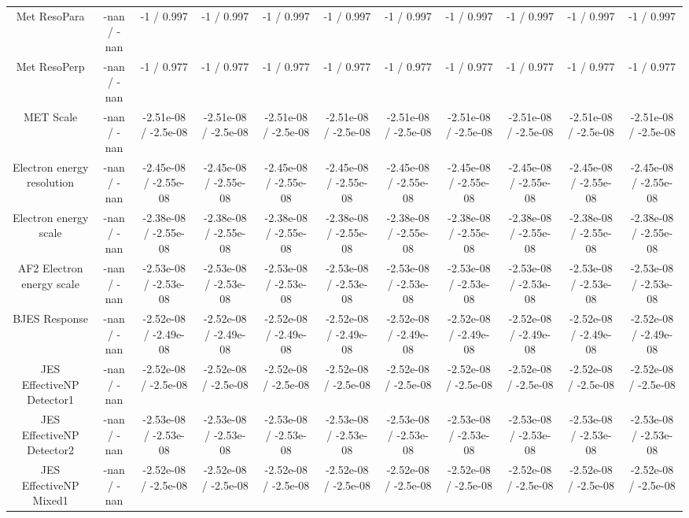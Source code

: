 \begin{table}[htbp]
\begin{center}
\begin{tabular}{|c|c|c|c|c|c|c|c|c|c|c|}
  Met ResoPara & -nan / -nan & -1 / 0.997 & -1 / 0.997 & -1 / 0.997 & -1 / 0.997 & -1 / 0.997 & -1 / 0.997 & -1 / 0.997 & -1 / 0.997 & -1 / 0.997 \\ 
  Met ResoPerp & -nan / -nan & -1 / 0.977 & -1 / 0.977 & -1 / 0.977 & -1 / 0.977 & -1 / 0.977 & -1 / 0.977 & -1 / 0.977 & -1 / 0.977 & -1 / 0.977 \\ 
  MET Scale & -nan / -nan & -2.51e-08 / -2.5e-08 & -2.51e-08 / -2.5e-08 & -2.51e-08 / -2.5e-08 & -2.51e-08 / -2.5e-08 & -2.51e-08 / -2.5e-08 & -2.51e-08 / -2.5e-08 & -2.51e-08 / -2.5e-08 & -2.51e-08 / -2.5e-08 & -2.51e-08 / -2.5e-08 \\ 
  Electron energy resolution & -nan / -nan & -2.45e-08 / -2.55e-08 & -2.45e-08 / -2.55e-08 & -2.45e-08 / -2.55e-08 & -2.45e-08 / -2.55e-08 & -2.45e-08 / -2.55e-08 & -2.45e-08 / -2.55e-08 & -2.45e-08 / -2.55e-08 & -2.45e-08 / -2.55e-08 & -2.45e-08 / -2.55e-08 \\ 
  Electron energy scale & -nan / -nan & -2.38e-08 / -2.55e-08 & -2.38e-08 / -2.55e-08 & -2.38e-08 / -2.55e-08 & -2.38e-08 / -2.55e-08 & -2.38e-08 / -2.55e-08 & -2.38e-08 / -2.55e-08 & -2.38e-08 / -2.55e-08 & -2.38e-08 / -2.55e-08 & -2.38e-08 / -2.55e-08 \\ 
  AF2 Electron energy scale & -nan / -nan & -2.53e-08 / -2.53e-08 & -2.53e-08 / -2.53e-08 & -2.53e-08 / -2.53e-08 & -2.53e-08 / -2.53e-08 & -2.53e-08 / -2.53e-08 & -2.53e-08 / -2.53e-08 & -2.53e-08 / -2.53e-08 & -2.53e-08 / -2.53e-08 & -2.53e-08 / -2.53e-08 \\ 
  BJES Response & -nan / -nan & -2.52e-08 / -2.49e-08 & -2.52e-08 / -2.49e-08 & -2.52e-08 / -2.49e-08 & -2.52e-08 / -2.49e-08 & -2.52e-08 / -2.49e-08 & -2.52e-08 / -2.49e-08 & -2.52e-08 / -2.49e-08 & -2.52e-08 / -2.49e-08 & -2.52e-08 / -2.49e-08 \\ 
  JES EffectiveNP Detector1 & -nan / -nan & -2.52e-08 / -2.5e-08 & -2.52e-08 / -2.5e-08 & -2.52e-08 / -2.5e-08 & -2.52e-08 / -2.5e-08 & -2.52e-08 / -2.5e-08 & -2.52e-08 / -2.5e-08 & -2.52e-08 / -2.5e-08 & -2.52e-08 / -2.5e-08 & -2.52e-08 / -2.5e-08 \\ 
  JES EffectiveNP Detector2 & -nan / -nan & -2.53e-08 / -2.53e-08 & -2.53e-08 / -2.53e-08 & -2.53e-08 / -2.53e-08 & -2.53e-08 / -2.53e-08 & -2.53e-08 / -2.53e-08 & -2.53e-08 / -2.53e-08 & -2.53e-08 / -2.53e-08 & -2.53e-08 / -2.53e-08 & -2.53e-08 / -2.53e-08 \\ 
  JES EffectiveNP Mixed1 & -nan / -nan & -2.52e-08 / -2.5e-08 & -2.52e-08 / -2.5e-08 & -2.52e-08 / -2.5e-08 & -2.52e-08 / -2.5e-08 & -2.52e-08 / -2.5e-08 & -2.52e-08 / -2.5e-08 & -2.52e-08 / -2.5e-08 & -2.52e-08 / -2.5e-08 & -2.52e-08 / -2.5e-08 \\ 

\end{tabular}
\end{center}
\end{table}
